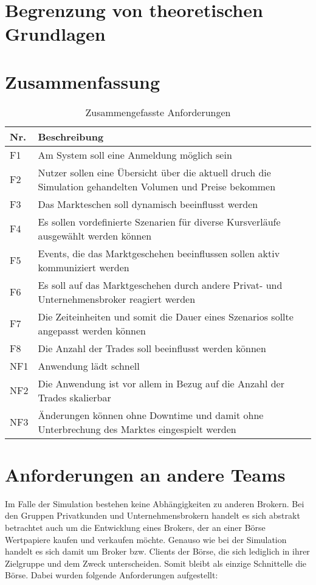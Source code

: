 \section{Begrenzung von theoretischen Grundlagen}
\section{Zusammenfassung}
	\begin{table}[h]
		\centering
		\begin{tabularx}{.8\textwidth}{l|X}
			Nr.     & Beschreibung                              \\\hline
			F1      & Am System soll eine Anmeldung möglich sein                  \\
			F2      & Nutzer sollen eine Übersicht über die aktuell druch die Simulation gehandelten Volumen und Preise bekommen  \\
			F3      & Das Markteschen soll dynamisch beeinflusst werden   \\
			F4      & Es sollen vordefinierte Szenarien für diverse Kursverläufe ausgewählt werden können \\
			F5      & Events, die das Marktgeschehen beeinflussen sollen aktiv kommuniziert werden  \\
			F6      & Es soll auf das Marktgeschehen durch andere Privat- und Unternehmensbroker reagiert werden  \\
			F7      & Die Zeiteinheiten und somit die Dauer eines Szenarios sollte angepasst werden können  \\
			F8		& Die Anzahl der Trades soll beeinflusst werden können \\\hline
			NF1     & Anwendung lädt schnell                    \\
			NF2     & Die Anwendung ist vor allem in Bezug auf die Anzahl der Trades skalierbar                \\
			NF3     & Änderungen können ohne Downtime und damit ohne Unterbrechung des Marktes eingespielt werden   \\
		\end{tabularx}
		\caption{Zusammengefasste Anforderungen}
		\label{tab:anforderungen}
	\end{table}
\section{Anforderungen an andere Teams}
	Im Falle der Simulation bestehen keine Abhängigkeiten zu anderen Brokern. Bei den Gruppen Privatkunden und Unternehmensbrokern handelt es sich abstrakt betrachtet auch um die Entwicklung eines Brokers, der an einer Börse Wertpapiere kaufen und verkaufen möchte. Genauso wie bei der Simulation handelt es sich damit um Broker bzw. Clients der Börse, die sich lediglich in ihrer Zielgruppe und dem Zweck unterscheiden. Somit bleibt als einzige Schnittelle die Börse. Dabei wurden folgende Anforderungen aufgestellt:
	
